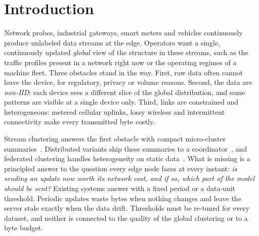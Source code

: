 \section{Introduction}\label{sec:intro}

Network probes, industrial gateways, smart meters and vehicles continuously produce unlabeled data streams at the edge. Operators want a single, continuously updated \emph{global} view of the structure in these streams, such as the traffic profiles present in a network right now or the operating regimes of a machine fleet. Three obstacles stand in the way. First, raw data often cannot leave the device, for regulatory, privacy or volume reasons. Second, the data are \emph{non-IID}: each device sees a different slice of the global distribution, and some patterns are visible at a single device only. Third, links are constrained and heterogeneous: metered cellular uplinks, lossy wireless and intermittent connectivity make every transmitted byte costly.

Stream clustering answers the first obstacle with compact micro-cluster summaries~\cite{aggarwal2003clustream,cao2006denstream}. Distributed variants ship these summaries to a coordinator~\cite{cormode2007divide,gama2011dgclust,tran2013communication}, and federated clustering handles heterogeneity on static data~\cite{dennis2021kfed,zhang2025afcl}. What is missing is a principled answer to the question every edge node faces at every instant: \emph{is sending an update now worth its network cost, and if so, which part of the model should be sent?} Existing systems answer with a fixed period or a data-unit threshold. Periodic updates waste bytes when nothing changes and leave the server stale exactly when the data drift. Thresholds must be re-tuned for every dataset, and neither is connected to the quality of the global clustering or to a byte budget.

